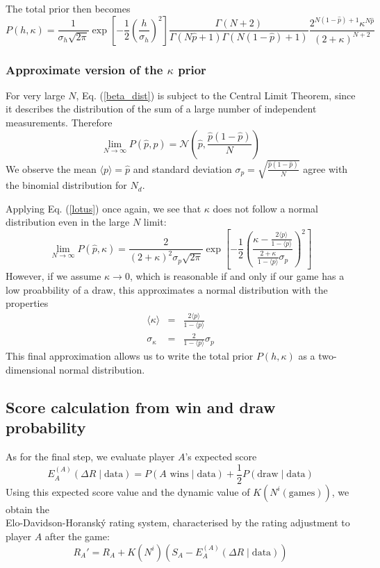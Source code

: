 \documentclass[12pt]{article}
\begin{document}
	The total prior then becomes
	\begin{equation}\label{prior_2}
	P(h,\kappa) = \frac{1}{\sigma_h\sqrt{2\pi}}\exp\left[-\frac{1}{2}\left(\frac{h}{\sigma_h}\right)^2\right]\frac{\Gamma(N+2)}{\Gamma(N\hat{p}+1)\Gamma(N(1-\hat{p})+1)}\frac{2^{N(1-\hat{p})+1}\kappa^{N\hat{p}}}{(2+\kappa)^{N+2}}
	\end{equation}
	\subsubsection{Approximate version of the $\kappa$ prior}	
	For very large $N$, Eq. (\ref{beta_dist}) is subject to the Central Limit Theorem, since it describes the distribution of the sum of a large number of independent measurements. Therefore
	\begin{equation}
	\lim_{N\to\infty} P(\hat{p},p) = \mathcal{N}\left(\hat{p},\frac{\hat{p}(1-\hat{p})}{N}\right)
	\end{equation}
	We observe the mean $\langle p\rangle=\hat{p}$ and standard deviation $\sigma_p=\sqrt{\frac{\hat{p}(1-\hat{p})}{N}}$ agree with the binomial distribution for $N_d$.
	
	Applying Eq. (\ref{lotus}) once again, we see that $\kappa$ does not follow a normal distribution even in the large $N$ limit:
	\begin{equation}
	\lim_{N\to\infty} P(\hat{p},\kappa)=\frac{2}{(2+\kappa)^2\sigma_p\sqrt{2\pi}}\exp\left[-\frac{1}{2}\left(\frac{\kappa-\frac{2\langle p\rangle}{1-\langle p\rangle}}{\frac{2+\kappa}{1-\langle p\rangle}\sigma_p}\right)^2\right]
	\end{equation}
	However, if we assume $\kappa\to 0$, which is reasonable if and only if our game has a low proabbility of a draw, this approximates a normal distribution with the properties
	\begin{eqnarray}
	\langle\kappa\rangle &=& \frac{2\langle p\rangle}{1-\langle p\rangle}\\
	\sigma_\kappa &=& \frac{2}{1-\langle p\rangle}\sigma_p
	\end{eqnarray}
	This final approximation allows us to write the total prior $P(h,\kappa)$ as a two-dimensional normal distribution.
	
	\subsection{Score calculation from win and draw probability}
	
	As for the final step, we evaluate player $A$'s expected score
	\begin{equation}
	E_A^{(A)}(\Delta R\mid\text{data}) = P(A\text{ wins}\mid\text{data}) + \frac{1}{2}P(\text{draw}\mid\text{data})
	\end{equation}
	Using this expected score value and the dynamic value of $K(N^i(\text{games}))$, we obtain the\\ Elo\nobreakdash-Davidson\nobreakdash-Horanský rating system, characterised by the rating adjustment to player $A$ after the game:
	\begin{equation}
	R_A' = R_A + K(N^i)(S_A - E_A^{(A)}(\Delta R\mid\text{data}))
	\end{equation}
\end{document}

